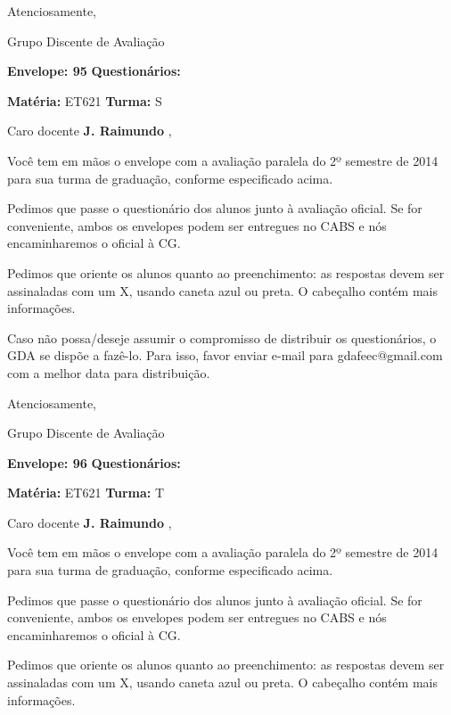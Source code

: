\documentclass[a5paper]{letter}
\begin{document}
Atenciosamente, 

Grupo Discente de Avaliação

\vspace{0.5cm}

{\bf Envelope: 95 }		\hfill	{\bf Questionários:} \hspace{2cm}

\newpage
\thispagestyle{empty}

\hfill {\bf Matéria:} ET621 {\bf Turma:} S

Caro docente {\bf J. Raimundo }, 

	Você tem em mãos o envelope com a avaliação paralela do 2º semestre de 2014 para sua turma de graduação, conforme especificado acima.

	Pedimos que passe o questionário dos alunos junto à avaliação oficial. Se for conveniente, ambos os envelopes podem ser entregues no CABS e nós encaminharemos o oficial à CG.

Pedimos que oriente os alunos quanto ao preenchimento: as respostas devem ser assinaladas com um X, usando caneta azul ou preta. O cabeçalho contém mais informações.

	Caso não possa/deseje assumir o compromisso de distribuir os questionários, o GDA se dispõe a fazê-lo. Para isso, favor enviar e-mail para gdafeec@gmail.com com a melhor data para distribuição.


Atenciosamente, 

Grupo Discente de Avaliação

\vspace{0.5cm}

{\bf Envelope: 96 }		\hfill	{\bf Questionários:} \hspace{2cm}

\newpage
\thispagestyle{empty}

\hfill {\bf Matéria:} ET621 {\bf Turma:} T

Caro docente {\bf J. Raimundo }, 

	Você tem em mãos o envelope com a avaliação paralela do 2º semestre de 2014 para sua turma de graduação, conforme especificado acima.

	Pedimos que passe o questionário dos alunos junto à avaliação oficial. Se for conveniente, ambos os envelopes podem ser entregues no CABS e nós encaminharemos o oficial à CG.

Pedimos que oriente os alunos quanto ao preenchimento: as respostas devem ser assinaladas com um X, usando caneta azul ou preta. O cabeçalho contém mais informações.
\end{document}
